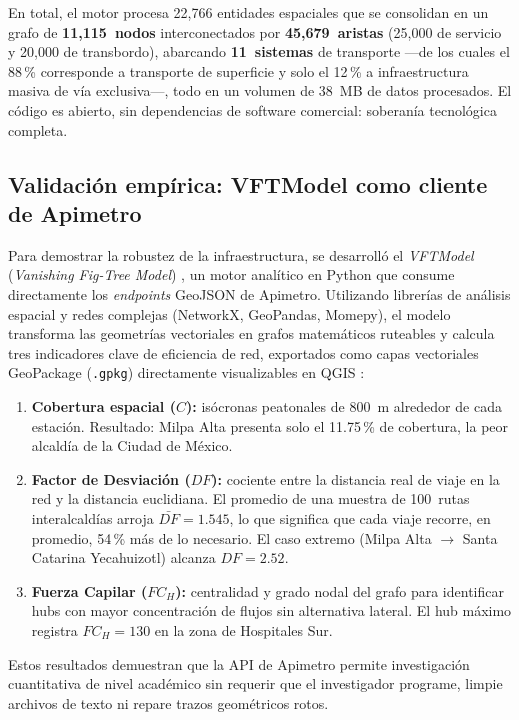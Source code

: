En total, el motor procesa 22,766 entidades espaciales que se consolidan en un grafo
de \textbf{11,115~nodos} interconectados por \textbf{45,679~aristas}
(25,000 de servicio y 20,000 de transbordo), abarcando \textbf{11~sistemas} de
transporte ---de los cuales el 88\,\% corresponde a transporte de superficie y solo
el 12\,\% a infraestructura masiva de vía exclusiva---, todo en un volumen de
38~MB de datos procesados.  El código es abierto, sin dependencias de software
comercial: soberanía tecnológica completa.

\subsection{Validación empírica: VFTModel como cliente de Apimetro}

Para demostrar la robustez de la infraestructura, se desarrolló el
\textit{VFTModel} (\textit{Vanishing Fig-Tree Model})
\citep{garibaldi2026vft}, un motor analítico en Python que consume directamente
los \textit{endpoints} GeoJSON de Apimetro.  Utilizando librerías de análisis
espacial y redes complejas (NetworkX, GeoPandas, Momepy), el modelo transforma las
geometrías vectoriales en grafos matemáticos ruteables y calcula tres indicadores
clave de eficiencia de red, exportados como capas vectoriales GeoPackage
(\texttt{.gpkg}) directamente visualizables en QGIS
\citep{fortin2016innovative, aldous2019optimal}:

\begin{enumerate}[nosep, leftmargin=1.5em]
  \item \textbf{Cobertura espacial ($C$):} isócronas peatonales de 800~m alrededor
    de cada estación.  Resultado: Milpa Alta presenta solo el 11.75\,\% de cobertura,
    la peor alcaldía de la Ciudad de México.
  \item \textbf{Factor de Desviación ($DF$):} cociente entre la distancia real de
    viaje en la red y la distancia euclidiana.  El promedio de una muestra de
    100~rutas interalcaldías arroja $\bar{DF}=1.545$, lo que significa que cada viaje
    recorre, en promedio, 54\,\% más de lo necesario.  El caso extremo (Milpa Alta
    $\to$ Santa Catarina Yecahuizotl) alcanza $DF=2.52$.
  \item \textbf{Fuerza Capilar ($FC_H$):} centralidad y grado nodal del grafo para
    identificar hubs con mayor concentración de flujos sin alternativa lateral.  El
    hub máximo registra $FC_H=130$ en la zona de Hospitales Sur.
\end{enumerate}

Estos resultados demuestran que la API de Apimetro permite investigación cuantitativa
de nivel académico sin requerir que el investigador programe, limpie archivos de texto
ni repare trazos geométricos rotos.
